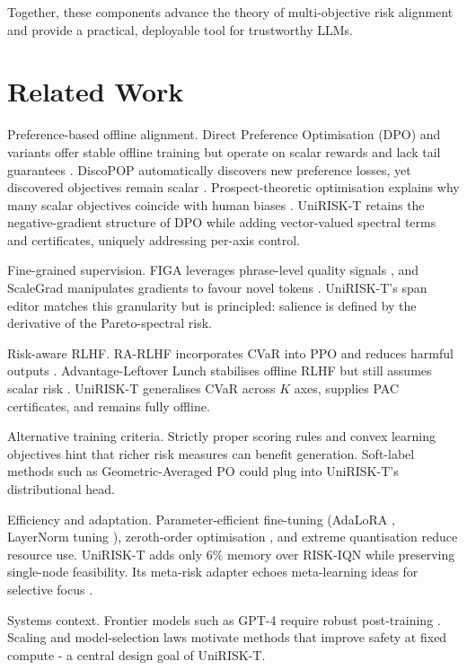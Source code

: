 \documentclass{article}
\begin{document}
Together, these components advance the theory of multi-objective risk alignment and provide a practical, deployable tool for trustworthy LLMs.

\section{Related Work}
Preference-based offline alignment. Direct Preference Optimisation (DPO) and variants offer stable offline training but operate on scalar rewards and lack tail guarantees \cite{tajwar-2024-preference}. DiscoPOP automatically discovers new preference losses, yet discovered objectives remain scalar \cite{lu-2024-discovering}. Prospect-theoretic optimisation explains why many scalar objectives coincide with human biases \cite{ethayarajh-2024-model}. UniRISK-T retains the negative-gradient structure of DPO while adding vector-valued spectral terms and certificates, uniquely addressing per-axis control.

Fine-grained supervision. FIGA leverages phrase-level quality signals \cite{guo-2023-beyond}, and ScaleGrad manipulates gradients to favour novel tokens \cite{lin-2021-straight}. UniRISK-T's span editor matches this granularity but is principled: salience is defined by the derivative of the Pareto-spectral risk.

Risk-aware RLHF. RA-RLHF incorporates CVaR into PPO and reduces harmful outputs \cite{chaudhary-2025-risk}. Advantage-Leftover Lunch stabilises offline RLHF but still assumes scalar risk \cite{baheti-2023-leftover}. UniRISK-T generalises CVaR across $K$ axes, supplies PAC certificates, and remains fully offline.

Alternative training criteria. Strictly proper scoring rules \cite{shao-2024-language} and convex learning objectives \cite{shao-2023-beyond} hint that richer risk measures can benefit generation. Soft-label methods such as Geometric-Averaged PO \cite{furuta-2024-geometric} could plug into UniRISK-T's distributional head.

Efficiency and adaptation. Parameter-efficient fine-tuning (AdaLoRA \cite{zhang-2023-adaptive}, LayerNorm tuning \cite{zhao-2023-tuning}), zeroth-order optimisation \cite{zhang-2024-revisiting}, and extreme quantisation \cite{malinovskii-2024-tuning} reduce resource use. UniRISK-T adds only 6\% memory over RISK-IQN while preserving single-node feasibility. Its meta-risk adapter echoes meta-learning ideas for selective focus \cite{seo-2024-train}.

Systems context. Frontier models such as GPT-4 require robust post-training \cite{openai-2023-gpt}. Scaling and model-selection laws motivate methods that improve safety at fixed compute \cite{lin-2024-selecting,aghajanyan-2023-scaling} - a central design goal of UniRISK-T.
\end{document}
